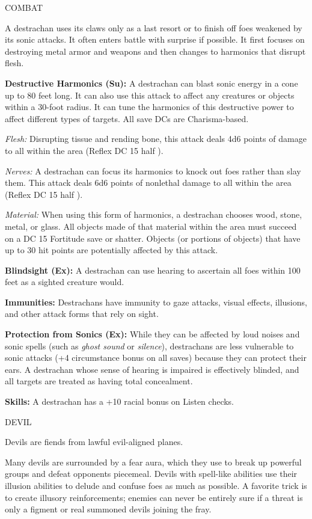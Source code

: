 \documentclass{article}
\begin{document}
COMBAT

A destrachan uses its claws only as a last resort or to finish off foes weakened 
by its sonic attacks. It often enters battle with surprise if possible. It first 
focuses on destroying metal armor and weapons and then changes to harmonics that 
disrupt flesh.

\textbf{Destructive Harmonics (Su): }A destrachan can blast sonic energy in a cone 
up to 80 feet long. It can also use this attack to affect any creatures or objects 
within a 30-foot radius. It can tune the harmonics of this destructive power to 
affect different types of targets. All save DCs are Charisma-based.

\textit{Flesh: }Disrupting tissue and rending bone, this attack deals 4d6 points 
of damage to all within the area (Reflex DC 15 half ).

\textit{Nerves: }A destrachan can focus its harmonics to knock out foes rather 
than slay them. This attack deals 6d6 points of nonlethal damage to all within 
the area (Reflex DC 15 half ).

\textit{Material: }When using this form of harmonics, a destrachan chooses wood, 
stone, metal, or glass. All objects made of that material within the area must 
succeed on a DC 15 Fortitude save or shatter. Objects (or portions of objects) 
that have up to 30 hit points are potentially affected by this attack.

\textbf{Blindsight (Ex): }A destrachan can use hearing to ascertain all foes within 
100 feet as a sighted creature would.

\textbf{Immunities:} Destrachans have immunity to gaze attacks, visual effects, 
illusions, and other attack forms that rely on sight.

\textbf{Protection from Sonics (Ex):} While they can be affected by loud noises 
and sonic spells (such as \textit{ghost sound }or \textit{silence}), destrachans 
are less vulnerable to sonic attacks (+4 circumstance bonus on all saves) because 
they can protect their ears. A destrachan whose sense of hearing is impaired is 
effectively blinded, and all targets are treated as having total concealment.

\textbf{Skills: }A destrachan has a +10 racial bonus on Listen checks.

\vspace{12pt}
{\LARGE{}DEVIL}

Devils are fiends from lawful evil-aligned planes. 

Many devils are surrounded by a fear aura, which they use to break up powerful 
groups and defeat opponents piecemeal. Devils with spell-like abilities use their 
illusion abilities to delude and confuse foes as much as possible. A favorite trick 
is to create illusory reinforcements; enemies can never be entirely sure if a threat 
is only a figment or real summoned devils joining the fray.
\end{document}
